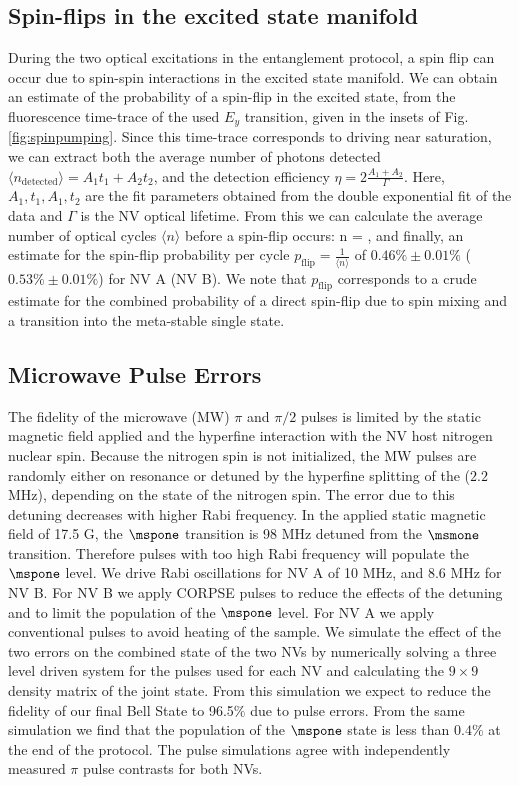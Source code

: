 \subsection{Spin-flips in the excited state manifold}
During the two optical excitations in the entanglement protocol, a spin flip can occur due to spin-spin interactions in the excited state manifold. We can obtain an estimate of the probability of a spin-flip in the excited state, from the fluorescence time-trace of the used $E_y$ transition, given in the insets of Fig.\,\ref{fig:spinpumping}. Since this time-trace corresponds to driving near saturation, we can extract both the average number of photons detected $\langle n_{\text{detected}} \rangle = A_1 t_1 + A_2 t_2 $, and the detection efficiency $\eta = 2\frac{A_1+A_2}{\Gamma}$. Here, $A_1,t_1,A_1,t_2$ are the fit parameters obtained from the double exponential fit of the data and $\Gamma$ is the NV optical lifetime. From this we can calculate the average number of optical cycles $\langle n \rangle$ before a spin-flip occurs:
\be
\langle n \rangle = ,
\ee
and finally, an estimate for the spin-flip probability per cycle $p_{\text{flip}}=\frac{1}{\langle n \rangle}$ of $0.46 \% \pm 0.01\%$ ($0.53\% \pm 0.01\%$) for NV A (NV B). We note that $p_{\text{flip}}$ corresponds to a crude estimate for the combined probability of a direct spin-flip due to spin mixing and a transition into the meta-stable single state. 

\subsection{Microwave Pulse Errors}
The fidelity of the microwave (MW) $\pi$ and $\pi/2$ pulses is limited by the static magnetic field applied and the hyperfine interaction with the NV host nitrogen nuclear spin. Because the nitrogen spin is not initialized, the MW pulses are randomly either on resonance or detuned by the hyperfine splitting of the \nfourteen ($2.2$\,MHz), depending on the state of the nitrogen spin. The error due to this detuning decreases with higher Rabi frequency. In the applied static magnetic field of 17.5 G, the $\mspone$ transition is 98 MHz detuned from the $\msmone$ transition. Therefore pulses with too high Rabi frequency will populate the $\mspone$ level. We drive Rabi oscillations for NV A of 10 MHz, and 8.6 MHz for NV B. For NV B we apply CORPSE pulses\cite{2003PhRvA..67d2308C} to reduce the effects of the detuning and to limit the population of the $\mspone$ level. For NV A we apply conventional pulses to avoid heating of the sample. We simulate the effect of the two errors on the combined state of the two NVs by numerically solving a three level driven system for the pulses used for each NV and calculating the $9\times9$ density matrix of the joint state. From this simulation we expect to reduce the fidelity of our final Bell State to 96.5$\%$  due to pulse errors. From the same simulation we find that the population of the $\mspone$ state is less than $0.4\%$ at the end of the protocol. The pulse simulations agree with independently measured $\pi$ pulse contrasts for both NVs.

